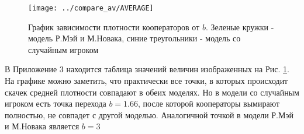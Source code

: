 \documentclass[12pt,a4paper]{article}
\begin{document}
	\begin{figure}
			\centering
			\texttt{[image: ../compare\_av/AVERAGE]}
			\caption{График зависимости плотности кооператоров от $b$. Зеленые кружки - модель Р.Мэй и М.Новака, синие треугольники - модель со случайным игроком}
			\label{average}
	\end{figure}
	
	В Приложение 3 находится таблица значений величин изображенных на Рис. \ref{average}. На графике можно заметить, что практически все точки, в которых происходит скачек средней плотности совпадают в обеих моделях. Но в модели со случайным игроком есть точка перехода $b=1.66$, после которой кооператоры вымирают полностью, не совпадет с другой моделью. Аналогичной точкой в модели Р.Мэй и М.Новака является $b=3$
	
\end{document}
